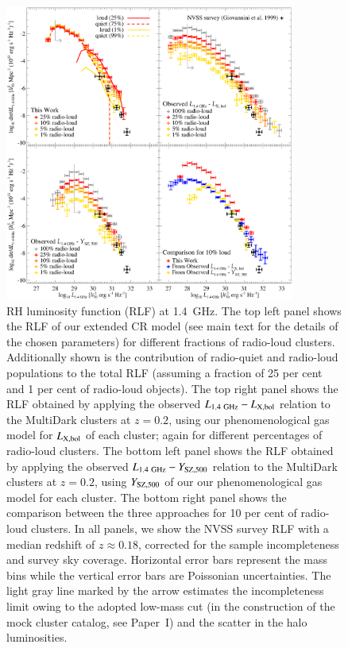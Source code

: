 \documentclass[useAMS,usenatbib]{mn2e}
\begin{document}
\begin{figure} 
\centering
\includegraphics[width=0.85\textwidth]{figures/RLFs_1.4.eps}
\caption{RH luminosity function (RLF) at 1.4~GHz. The top left panel shows the
  RLF of our extended CR model (see main text for the details of the chosen
  parameters) for different fractions of radio-loud clusters. Additionally shown
  is the contribution of radio-quiet and radio-loud populations to the total RLF
  (assuming a fraction of 25 per cent and 1 per cent of radio-loud objects). The
  top right panel shows the RLF obtained by applying the observed
  $L_{1.4~{\mathrm{GHz}}}-L_{{\mathrm{X,bol}}}$ relation to the MultiDark clusters at $z =
  0.2$, using our phenomenological gas model for $L_{{\mathrm{X,bol}}}$ of each
  cluster; again for different percentages of radio-loud clusters.  The bottom
  left panel shows the RLF obtained by applying the observed
  $L_{1.4~{\mathrm{GHz}}}-Y_{{\mathrm{SZ}}, 500}$ relation to the MultiDark clusters at $z
  = 0.2$, using $Y_{{\mathrm{SZ}}, 500}$ of our our phenomenological gas model for
  each cluster. The bottom right panel shows the comparison between the three
  approaches for 10 per cent of radio-loud clusters. In all panels, we show the NVSS
  survey RLF \citep{1999NewA....4..141G} with a median redshift of $z\approx
  0.18$, corrected for the sample incompleteness and survey sky coverage.
  Horizontal error bars represent the mass bins while the vertical error bars
  are Poissonian uncertainties. The light gray line marked by the arrow
  estimates the incompleteness limit owing to the adopted low-mass cut (in the
  construction of the mock cluster catalog, see Paper~I) and the scatter in the
  halo luminosities.}
\label{fig:RLF_1.4}
\end{figure}
\end{document}

